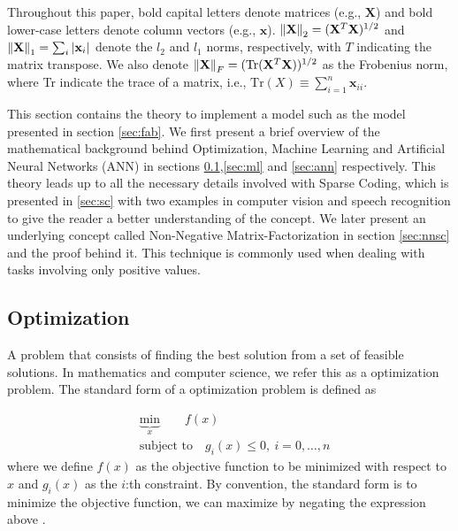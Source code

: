 Throughout this paper, bold capital letters denote matrices (e.g., $\mathbf{X}$) and bold lower-case letters denote column vectors (e.g., $\mathbf{x}$). $\left\lVert\mathbf{X}\right\rVert_2 =
(\mathbf{X}^T\mathbf{X})^{1/2}$ and $\left\lVert\mathbf{X}\right\rVert_1 = \sum_i |\mathbf{x}_i|$
denote the $l_2$ and $l_1$ norms, respectively, with $T$ indicating the
matrix transpose. We also denote $\left\lVert\mathbf{X}\right\rVert_F =
(\text{Tr}(\mathbf{X}^T\mathbf{X}))^{1/2}$ as the Frobenius norm, where
Tr indicate the trace of a matrix, i.e.,  $\text{Tr}(X)\equiv \sum_{i=1}^n \mathbf{x}_{ii}$.

This section contains the theory to implement a model such as the model presented in section \ref{sec:fab}. We first present a brief overview of the mathematical background behind Optimization, Machine Learning and Artificial Neural Networks (ANN) in sections \ref{sec:opt},\ref{sec:ml} and \ref{sec:ann} respectively. This theory leads up to all the necessary details involved with Sparse Coding, which is presented in \ref{sec:sc} with two examples in computer vision and speech recognition to give the reader a better understanding of the concept. We later present an underlying concept called Non-Negative Matrix-Factorization in section \ref{sec:nnsc} and the proof behind it. This technique is commonly used when dealing with tasks involving only positive values. 


\label{sec:theoretical}

\subsection{Optimization}
\label{sec:opt}
A problem that consists of finding the best solution from a set of feasible solutions. In mathematics and computer science, we refer this as a optimization problem. The standard form of a optimization problem is defined as

\begin{align*}
& \underbrace{\text{min}}_{x} \qquad f(x) \\
& \text{subject to} \quad g_i(x) \leq 0, \ i = 0,\dots,n
\end{align*}
where we define $f(x)$ as the objective function to be minimized with respect to $x$ and $g_i(x)$ as the $i$:th constraint. By convention, the standard form is to minimize the objective function, we can maximize by negating the expression above \cite{convex}.

